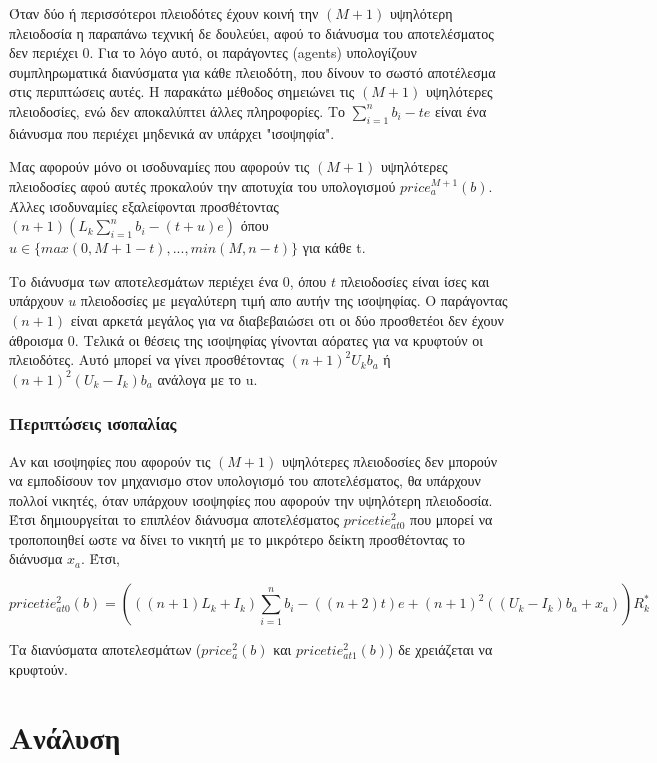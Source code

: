 \documentclass[a4paper,11pt]{article}
\begin{document}
Όταν δύο ή περισσότεροι πλειοδότες έχουν κοινή την $(M + 1)$ υψηλότερη πλειοδοσία η παραπάνω τεχνική δε δουλεύει, αφού το διάνυσμα του
αποτελέσματος δεν περιέχει 0. Για το λόγο αυτό, οι παράγοντες (agents) υπολογίζουν συμπληρωματικά διανύσματα για κάθε πλειοδότη, που δίνουν το
σωστό αποτέλεσμα στις περιπτώσεις αυτές. Η παρακάτω μέθοδος σημειώνει τις $(M + 1)$ υψηλότερες πλειοδοσίες, ενώ δεν αποκαλύπτει άλλες πληροφορίες.
Το $\sum_{i=1}^{n}{b_i-te}$ είναι ένα διάνυσμα που περιέχει μηδενικά αν υπάρχει "ισοψηφία".

Μας αφορούν μόνο οι ισοδυναμίες που αφορούν τις $(M + 1)$ υψηλότερες πλειοδοσίες αφού αυτές προκαλούν την αποτυχία του υπολογισμού 
$price_{a}^{M+1}(b)$. Άλλες ισοδυναμίες εξαλείφονται προσθέτοντας \\ $(n+1)\left ( L_k \sum_{i=1}^{n} b_i - (t+u)e \right )$ όπου 
$u \in \{ max(0, M + 1 − t),..., min(M, n − t)\}$ για κάθε t.

Το διάνυσμα των αποτελεσμάτων περιέχει ένα 0, όπου $t$ πλειοδοσίες είναι ίσες και υπάρχουν $u$ πλειοδοσίες με μεγαλύτερη τιμή απο αυτήν της
ισοψηφίας. Ο παράγοντας $(n + 1)$ είναι αρκετά μεγάλος για να διαβεβαιώσει οτι οι δύο προσθετέοι δεν έχουν άθροισμα 0. Τελικά οι θέσεις της
ισοψηφίας γίνονται αόρατες για να κρυφτούν οι πλειοδότες. Αυτό μπορεί να γίνει προσθέτοντας $(n+1)^2U_kb_a$ ή $(n+1)^2(U_k-I_k)b_a$ ανάλογα με το
u.

\subsubsection{Περιπτώσεις ισοπαλίας}

Αν και ισοψηφίες που αφορούν τις $(M+1)$ υψηλότερες πλειοδοσίες δεν μπορούν να εμποδίσουν τον μηχανισμο στον υπολογισμό του αποτελέσματος, θα
υπάρχουν πολλοί νικητές, όταν υπάρχουν ισοψηφίες που αφορούν την υψηλότερη πλειοδοσία. Έτσι δημιουργείται το επιπλέον διάνυσμα αποτελέσματος
$pricetie_{at0}^{2}$ που μπορεί να τροποποιηθεί ωστε να δίνει το νικητή με το μικρότερο δείκτη προσθέτοντας το διάνυσμα $x_a$. Έτσι,

\begin{displaymath}
	pricetie_{at0}^{2}(b) = \left ( ((n+1)L_k+I_k) \sum_{i=1}^{n}b_i - \left ( (n+2)t \right)e + (n+1)^2((U_k-I_k)b_a+x_a) \right ) R^*_{k}
\end{displaymath}

Τα διανύσματα αποτελεσμάτων ($price_{a}^{2}(b)$ και $pricetie_{at1}^{2}(b)$) δε χρειάζεται να κρυφτούν.

\section{Ανάλυση}
\end{document}
